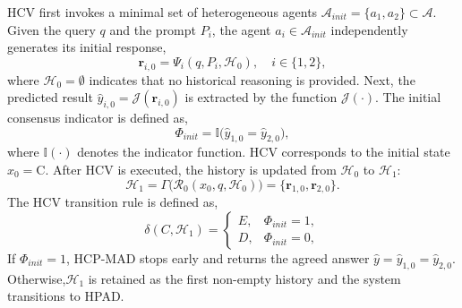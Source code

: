 \documentclass[11pt]{article}
\begin{document}
HCV first invokes a minimal set of heterogeneous agents $\mathcal{A}_{init} = \{a_1, a_2\} \subset \mathcal{A}$. 
Given the query $q$ and the prompt $P_i$, the agent $a_i \in \mathcal{A}_{init}$ independently generates its initial response,
\begin{equation}
    \boldsymbol{r}_{i,0} = \Psi_i(q, P_i, \mathcal{H}_0), \quad i \in \{1, 2\},
\end{equation}
where \(\mathcal{H}_0=\emptyset\) indicates that no historical reasoning is provided.
Next, the predicted result $\hat{y}_{i,0}= \mathcal{J}(\boldsymbol{r}_{i,0})$ is extracted by the function $\mathcal{J}(\cdot)$.
The initial consensus indicator is defined as,
\begin{equation}
\Phi_{init} = \mathbb{I}\bigl( \hat{y}_{1,0} = \hat{y}_{2,0} \bigr),
\end{equation}
where $\mathbb{I}(\cdot)$ denotes the indicator function. %
HCV corresponds to the initial state $x_0=\mathrm{C}$. After HCV is executed, the history is updated from
\(\mathcal{H}_0\) to \(\mathcal{H}_1\):
\begin{equation}
\mathcal{H}_{1}
=
\Gamma\bigl(\mathcal{R}_0(x_0, q,\mathcal{H}_0)\bigr)
=
\{
\boldsymbol{r}_{1,0},
\boldsymbol{r}_{2,0}
\}.
\end{equation}
The HCV transition rule is defined as,
\begin{equation}
\delta(C,\mathcal{H}_1)=
\begin{cases}
{E}, & \Phi_{init}=1,\\
D, & \Phi_{init}=0,
\end{cases}
\end{equation}
If $\Phi_{init}=1$, HCP-MAD stops early and returns the
agreed answer $\hat{y}=\hat{y}_{1,0}=\hat{y}_{2,0}$. Otherwise,$\mathcal{H}_1$ is retained as the first
non-empty history and the system transitions to HPAD.
\end{document}
